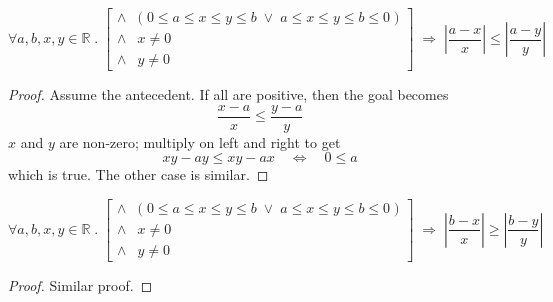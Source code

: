 
\begin{lem}
\label{monotoneleft}
\begin{equation*}
\forall a, b, x, y \in \mathbb{R} \; . \; 
\left [
\begin{array}{cl} 
\wedge & \big ( \; 0 \leq a \leq x \leq y \leq b \; \vee \; 
a \leq x \leq y \leq b \leq 0 \; \big )\\
\wedge & x \neq 0\\
\wedge & y \neq 0
\end{array} \right ] \;
\Longrightarrow \;
\left | \frac{a - x}{x} \right | \leq \left | \frac{a - y}{y} \right |
\end{equation*}
\begin{proof} Assume the antecedent. If all are positive, then the goal
becomes
\begin{equation*}
\frac{x - a}{x} \leq \frac{y - a}{y}
\end{equation*}
$x$ and $y$ are non-zero; multiply on left and right to get
\begin{equation*}
xy - ay \leq xy - ax \quad \Leftrightarrow \quad 0 \leq a
\end{equation*}
which is true. The other case is similar.
\end{proof}
\end{lem}

\begin{lem}
\label{monotoneright}
\begin{equation*}
\forall a, b, x, y \in \mathbb{R} \; . \; 
\left [
\begin{array}{cl} 
\wedge & \big ( \; 0 \leq a \leq x \leq y \leq b \; \vee \; 
a \leq x \leq y \leq b \leq 0 \; \big )\\
\wedge & x \neq 0\\
\wedge & y \neq 0
\end{array} \right ] \;
\Longrightarrow \;
\left | \frac{b - x}{x} \right | \geq \left | \frac{b - y}{y} \right |
\end{equation*}
\begin{proof} Similar proof.
\end{proof}
\end{lem}

